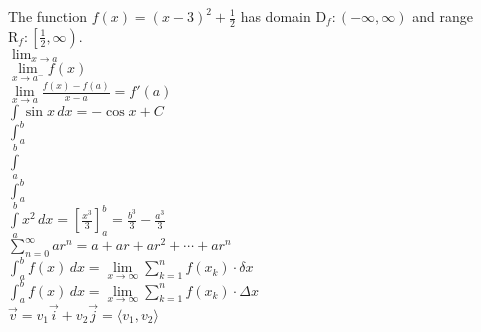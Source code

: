 \documentclass[11pt]{article}
\begin{document}
The function $f(x)=(x-3)^2+\frac{1}{2}$ has domain $\mathrm{D}_f:(-\infty,\infty)$ and range $\mathrm{R}_f:\left[ \frac{1}{2},\infty \right)$.\\

$\lim_{x \to a}$\\

$\lim \limits_{x \to a^-}f(x)$\\

$\displaystyle{\lim \limits_{x \to a} \frac{f(x)-f(a)}{x-a}=f'(a)}$\\

$\displaystyle{\int \sin x \,dx=-\cos x + C}$\\

$\int_a^b$\\

$\int \limits_a^b$\\

$\displaystyle{\int_a^b}$\\

$\displaystyle{\int \limits_{a}^{b}x^2 \,dx=\left[ \frac{x^3}{3}\right]_{a}^{b}=\frac{b^3}{3}-\frac{a^3}{3}}$\\

$\displaystyle{\sum \limits_{n=0}^{\infty}ar^n=a+ar+ar^2+ \cdots +ar^n}$\\

$\displaystyle{\int_a^b f(x) \,dx=\lim \limits_{x \to \infty}\sum \limits_{k=1}^{n}f(x_k) \cdot \delta x}$\\

$\displaystyle{\int_a^b f(x) \,dx=\lim \limits_{x \to \infty}\sum \limits_{k=1}^{n}f(x_k) \cdot \Delta x}$\\

$\vec{v}=v_1 \vec{i}+v_2 \vec{j}=\langle v_1, v_2 \rangle$
\end{document}

